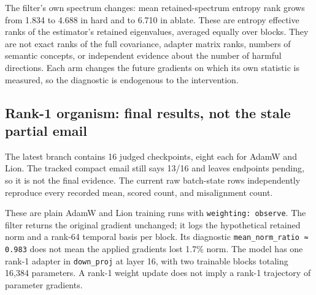 \documentclass[
  british,
  10pt,
  a4paper,
]{article}
\begin{document}
The filter's own spectrum changes: mean retained-\allowbreak{}spectrum
entropy rank grows from 1.834 to 4.688 in hard and to 6.710 in ablate.
These are entropy effective ranks of the estimator's retained
eigenvalues,\allowbreak{} averaged equally over blocks. They are not
exact ranks of the full covariance,\allowbreak{} adapter matrix ranks,
numbers of semantic concepts, or independent evidence about the number
of harmful directions.\allowbreak{} Each arm changes the future
gradients on which its own statistic is measured, so the diagnostic is
endogenous to the intervention\allowbreak{}.\allowbreak{}

\subsection{Rank-1 organism: final results, not the stale partial
email}\label{em-results-audit--rank-1-organism-final-results-not-the-stale-partial-email}

The latest branch contains 16 judged checkpoints,\allowbreak{} eight
each for AdamW and Lion. The tracked compact email still says 13/16 and
leaves endpoints pending, so it is not the final evidence. The current
raw batch-\allowbreak{}state rows independently reproduce every recorded
mean, scored count, and misalignment count.

These are plain AdamW and Lion training runs with
\texttt{weighting:\allowbreak{} \allowbreak{}observe}. The filter
returns the original gradient unchanged; it logs the hypothetical
retained norm and a rank-64 temporal basis per block. Its diagnostic
\texttt{mean\_\allowbreak{}norm\_\allowbreak{}ratio \allowbreak{}≈ \allowbreak{}0.\allowbreak{}983}
does not mean the applied gradients lost 1.7\% norm. The model has one
rank-1 adapter in \texttt{down\_proj} at layer 16, with two trainable
blocks totaling 16,384 parameters.\allowbreak{} A rank-1 weight update
does not imply a rank-1 trajectory of parameter gradients.
\end{document}
